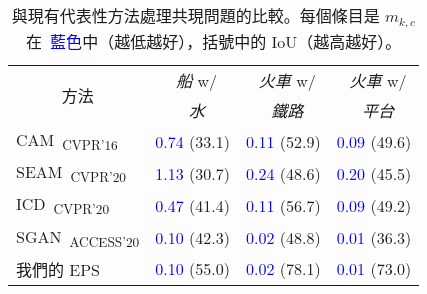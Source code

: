 
\newcommand{\R}{\textcolor{red}}
\newcommand{\B}{\textcolor{blue}}

\begin{table}[]
\centering
{\small
\begin{tabular}{@{}llll@{}}
\toprule
\multicolumn{1}{c}{\multirow{2}{*}{方法}} & \multicolumn{1}{c}{~\emph{船} w/}   & \multicolumn{1}{c}{~\emph{火車} w/}  & \multicolumn{1}{c}{~\emph{火車} w/}  \\
& \multicolumn{1}{c}{~\emph{水}} & \multicolumn{1}{c}{~\emph{鐵路}}          & \multicolumn{1}{c}{~\emph{平台}}  \\ \midrule
\multicolumn{1}{l}{CAM~\cite{zhou2016learning}\textsubscript{CVPR'16}}              & \B{0.74} (33.1)   & \B{0.11} (52.9)   & \multicolumn{1}{l}{\B{0.09} (49.6)}   \\
\multicolumn{1}{l}{SEAM~\cite{wang2020self}\textsubscript{CVPR'20}}                 & \B{1.13} (30.7)   & \B{0.24} (48.6)   & \multicolumn{1}{l}{\B{0.20} (45.5)}   \\
\multicolumn{1}{l}{ICD~\cite{fan2020learning}\textsubscript{CVPR'20}}               & \B{0.47} (41.4)   & \B{0.11} (56.7)   & \multicolumn{1}{l}{\B{0.09} (49.2)}   \\
\multicolumn{1}{l}{SGAN~\cite{yao2020saliency}\textsubscript{ACCESS'20}}            & \B{0.10} (42.3)   & \B{0.02} (48.8)   & \multicolumn{1}{l}{\B{0.01} (36.3)}   \\
\multicolumn{1}{l}{我們的 EPS}                                                         & \B{0.10} (55.0)   & \B{0.02} (78.1)   & \multicolumn{1}{l}{\B{0.01} (73.0)}   \\ \bottomrule
\end{tabular}
}
\vspace{2mm}
\caption{與現有代表性方法處理共現問題的比較。每個條目是 {$m_{k,c}$} 在~\B{藍色}中（越低越好），括號中的 IoU（越高越好）。} \vspace{-2mm}
\label{tab:co_quantitative_v4}

\end{table}
